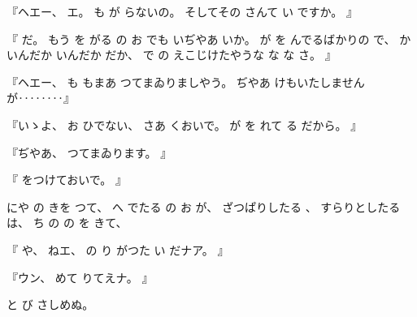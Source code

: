 %
『ヘエー、
%
エ。
%
も
が
らないの。
%
そしてその
さんて
い
ですか。
』

%
『
だ。
%
もう
を
がる
の
お
でも
いぢやあ
いか。
%
が
を
んでるばかりの
で、
%
かいんだか
いんだか
だか、
%
で
の
えこじけたやうな
な
な
さ。
』

%
『ヘエー、
%
も
もまあ
つてまゐりましやう。
%
ぢやあ
けもいたしませんが‥‥‥‥』

%
『いゝよ、
%
お
ひでない、
%
さあ
くおいで。
%
が
を
れて
る
だから。
』

%
『ぢやあ、
%
つてまゐります。
』

%
『
をつけておいで。
』

%
にや
の
きを
つて、
%
へ
でたる
の
お
が、
%
ざつぱりしたる
、
%
すらりとしたる
は、
%
ち
の
の
を
きて、

%
『
や、
%
ねエ、
%
の
り
がつた
い
だナア。
』

%
『ウン、
%
めて
りてえナ。
』

%
と
び
さしめぬ。

